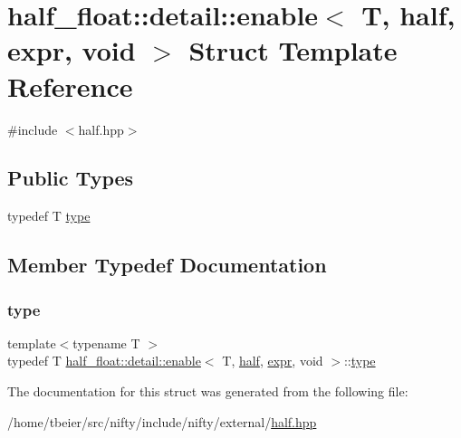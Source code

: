 \hypertarget{structhalf__float_1_1detail_1_1enable_3_01T_00_01half_00_01expr_00_01void_01_4}{}\section{half\+\_\+float\+:\+:detail\+:\+:enable$<$ T, half, expr, void $>$ Struct Template Reference}
\label{structhalf__float_1_1detail_1_1enable_3_01T_00_01half_00_01expr_00_01void_01_4}


{\ttfamily \#include $<$half.\+hpp$>$}

\subsection*{Public Types}
\begin{DoxyCompactItemize}
\item 
typedef T \hyperlink{structhalf__float_1_1detail_1_1enable_3_01T_00_01half_00_01expr_00_01void_01_4_a382791489c38b31392293c5f660d0689}{type}
\end{DoxyCompactItemize}


\subsection{Member Typedef Documentation}
\mbox{\label{structhalf__float_1_1detail_1_1enable_3_01T_00_01half_00_01expr_00_01void_01_4_a382791489c38b31392293c5f660d0689}} 
\subsubsection{\texorpdfstring{type}{type}}
{\footnotesize\ttfamily template$<$typename T $>$ \\
typedef T \hyperlink{structhalf__float_1_1detail_1_1enable}{half\+\_\+float\+::detail\+::enable}$<$ T, \hyperlink{classhalf__float_1_1half}{half}, \hyperlink{structhalf__float_1_1detail_1_1expr}{expr}, void $>$\+::\hyperlink{structhalf__float_1_1detail_1_1enable_3_01T_00_01half_00_01expr_00_01void_01_4_a382791489c38b31392293c5f660d0689}{type}}



The documentation for this struct was generated from the following file\+:\begin{DoxyCompactItemize}
\item 
/home/tbeier/src/nifty/include/nifty/external/\hyperlink{half_8hpp}{half.\+hpp}\end{DoxyCompactItemize}
